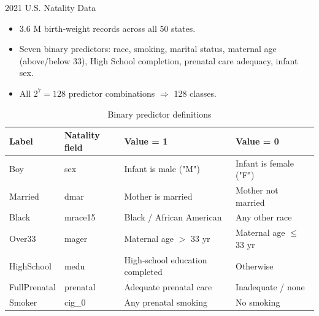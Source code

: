\documentclass[aspectratio=169,professionalfonts]{beamer}
\begin{document}
\begin{frame}{2021 U.S. Natality Data}
\begin{itemize}
  \item $3.6$ M birth‑weight records across all 50 states.
  \item Seven binary predictors: race, smoking, marital status, maternal age (above/below 33), High School completion, prenatal care adequacy, infant sex.
  \item All $2^{7}=128$ predictor combinations $\Rightarrow$ 128 classes.
\end{itemize}

\begin{table}[ht]
\centering
\small
\caption{Binary predictor definitions}
\begin{tabular}{@{}llll@{}}
\toprule
\textbf{Label} & \textbf{Natality field} & \textbf{Value = 1} & \textbf{Value = 0} \\ \midrule
Boy          & sex      & Infant is male ("M")                     & Infant is female ("F") \\
Married      & dmar     & Mother is married                        & Mother not married     \\
Black        & mrace15  & Black / African American                 & Any other race         \\
Over33       & mager    & Maternal age $>$ 33 yr                   & Maternal age $\le$ 33 yr \\
HighSchool   & medu     & High‑school education completed          & Otherwise              \\
FullPrenatal & prenatal & Adequate prenatal care                   & Inadequate / none      \\
Smoker       & cig\_0   & Any prenatal smoking                     & No smoking             \\
\bottomrule
\end{tabular}
\end{table}
\end{frame}
\end{document}
